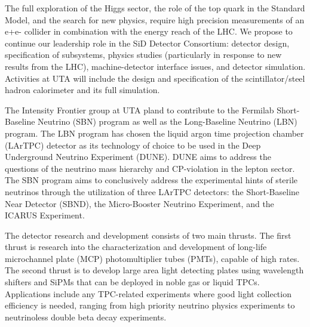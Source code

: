 \documentclass[preprint,11pt]{article}
\begin{document}
The full exploration of the Higgs sector, the role of the top quark in the Standard Model, and the search for new physics, require high precision measurements of an e+e- collider in combination with the energy reach of the LHC. We propose to continue our leadership role in the SiD Detector Consortium: detector design, specification of subsystems, physics studies (particularly in response to new results from the LHC), machine-detector interface issues, and detector simulation. Activities at UTA will include the design and specification of the scintillator/steel hadron calorimeter and its full simulation. 

The Intensity Frontier group at UTA pland to contribute to the Fermilab Short-Baseline Neutrino (SBN) program as well as the Long-Baseline Neutrino (LBN) program. The LBN program has chosen the liquid argon time projection chamber (LArTPC) detector as its technology of choice to be used in the Deep Underground Neutrino Experiment (DUNE).  DUNE aims to address the questions of the neutrino mass hierarchy and CP-violation in the lepton sector. The SBN program aims to conclusively address the experimental hints of sterile neutrinos through the utilization of three LArTPC detectors: the Short-Baseline Near Detector (SBND), the Micro-Booster Neutrino Experiment, and the ICARUS Experiment.

The detector research and development consists of two main thrusts. The first thrust is research into the characterization and development of long-life microchannel plate (MCP) photomultiplier tubes (PMTs), capable of high rates. The second thrust is to develop large area light detecting plates using wavelength shifters and SiPMs that can be deployed in noble gas or liquid TPCs.  Applications include any TPC-related experiments where good light collection efficiency is needed, ranging from high priority neutrino physics experiments to neutrinoless double beta decay experiments.
\end{document}
